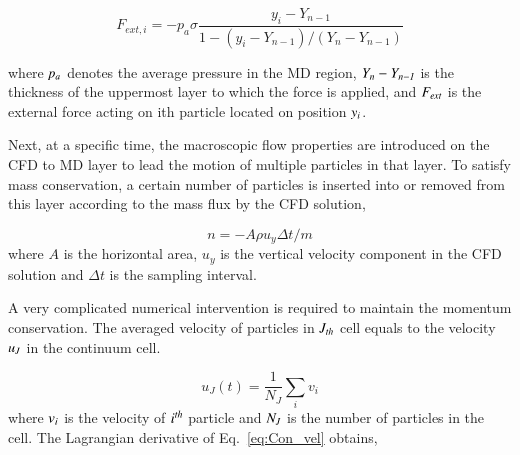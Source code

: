 \documentclass[preprint,12pt]{elsarticle}
\begin{document}
\vspace{-.2em}
\begin{equation}
 F_{ext, i} = -p_{a}\sigma\frac{y_{i}-Y_{n-1}}{1-(y_{i}-Y_{n-1})/(Y_{n}-Y_{n-1})}
 \label{eq:External_Force}
\end{equation}
\normalsize

where  $\it p_{a}$ denotes the average pressure in the MD region, $\it Y_{n}-Y_{n-1}$ is the thickness of the uppermost layer to which the force is applied, and $\it F_{ext}$ is the external force acting on ith particle located on position $\it y_{i}$.


Next, at a specific time, the macroscopic flow properties are introduced on the CFD to MD layer to lead the motion of multiple particles in that layer. To satisfy mass conservation, a certain number of particles is inserted into or removed from this layer according to the mass flux by the CFD solution,

\vspace{-.2em}
\begin{equation}
n = -A \rho u_y \Delta t / m
 \label{eq:Mass_Flux}
\end{equation}
\normalsize
where $A$ is the horizontal area, $u_y$ is the vertical velocity component in the CFD solution and $\Delta t$ is the sampling interval.

A very complicated numerical intervention is required to maintain the momentum conservation. The averaged velocity of particles in $\it J_{th}$ cell equals to the velocity $\it u_{J}$ in the continuum cell.

\vspace{-.2em}
\begin{equation}
 u_{J}(t) = \frac{1}{N_{J}} \displaystyle\sum_{i} v_{i}
 \label{eq:Con_vel}
\end{equation}
\normalsize
where $\it v_{i}$ is the velocity of $\it i^{th}$ particle and $\it N_{J}$ is the number of particles in the cell. The Lagrangian derivative of Eq.~\ref{eq:Con_vel} obtains,
\end{document}
